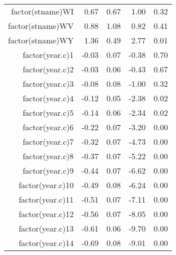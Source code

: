 \begin{table}[ht]
\begin{tabular}{rrrrr}
  factor(stname)WI & 0.67 & 0.67 & 1.00 & 0.32 \\ 
  factor(stname)WV & 0.88 & 1.08 & 0.82 & 0.41 \\ 
  factor(stname)WY & 1.36 & 0.49 & 2.77 & 0.01 \\ 
  factor(year.c)1 & -0.03 & 0.07 & -0.38 & 0.70 \\ 
  factor(year.c)2 & -0.03 & 0.06 & -0.43 & 0.67 \\ 
  factor(year.c)3 & -0.08 & 0.08 & -1.00 & 0.32 \\ 
  factor(year.c)4 & -0.12 & 0.05 & -2.38 & 0.02 \\ 
  factor(year.c)5 & -0.14 & 0.06 & -2.34 & 0.02 \\ 
  factor(year.c)6 & -0.22 & 0.07 & -3.20 & 0.00 \\ 
  factor(year.c)7 & -0.32 & 0.07 & -4.73 & 0.00 \\ 
  factor(year.c)8 & -0.37 & 0.07 & -5.22 & 0.00 \\ 
  factor(year.c)9 & -0.44 & 0.07 & -6.62 & 0.00 \\ 
  factor(year.c)10 & -0.49 & 0.08 & -6.24 & 0.00 \\ 
  factor(year.c)11 & -0.51 & 0.07 & -7.11 & 0.00 \\ 
  factor(year.c)12 & -0.56 & 0.07 & -8.05 & 0.00 \\ 
  factor(year.c)13 & -0.61 & 0.06 & -9.70 & 0.00 \\ 
  factor(year.c)14 & -0.69 & 0.08 & -9.01 & 0.00 \\ 
   \hline
\end{tabular}
\end{table}
